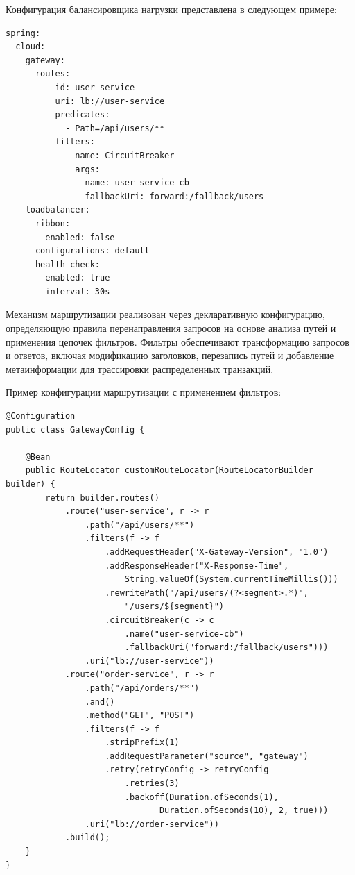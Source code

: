 Конфигурация балансировщика нагрузки представлена в следующем примере:

\begin{verbatim}
spring:
  cloud:
    gateway:
      routes:
        - id: user-service
          uri: lb://user-service
          predicates:
            - Path=/api/users/**
          filters:
            - name: CircuitBreaker
              args:
                name: user-service-cb
                fallbackUri: forward:/fallback/users
    loadbalancer:
      ribbon:
        enabled: false
      configurations: default
      health-check:
        enabled: true
        interval: 30s
\end{verbatim}

Механизм маршрутизации реализован через декларативную конфигурацию, определяющую правила перенаправления запросов на основе анализа путей и применения цепочек фильтров. Фильтры обеспечивают трансформацию запросов и ответов, включая модификацию заголовков, перезапись путей и добавление метаинформации для трассировки распределенных транзакций.

Пример конфигурации маршрутизации с применением фильтров:

\begin{verbatim}
@Configuration
public class GatewayConfig {

    @Bean
    public RouteLocator customRouteLocator(RouteLocatorBuilder builder) {
        return builder.routes()
            .route("user-service", r -> r
                .path("/api/users/**")
                .filters(f -> f
                    .addRequestHeader("X-Gateway-Version", "1.0")
                    .addResponseHeader("X-Response-Time",
                        String.valueOf(System.currentTimeMillis()))
                    .rewritePath("/api/users/(?<segment>.*)",
                        "/users/${segment}")
                    .circuitBreaker(c -> c
                        .name("user-service-cb")
                        .fallbackUri("forward:/fallback/users")))
                .uri("lb://user-service"))
            .route("order-service", r -> r
                .path("/api/orders/**")
                .and()
                .method("GET", "POST")
                .filters(f -> f
                    .stripPrefix(1)
                    .addRequestParameter("source", "gateway")
                    .retry(retryConfig -> retryConfig
                        .retries(3)
                        .backoff(Duration.ofSeconds(1),
                               Duration.ofSeconds(10), 2, true)))
                .uri("lb://order-service"))
            .build();
    }
}
\end{verbatim}

